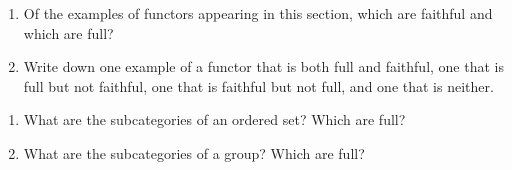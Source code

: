 \documentclass[12 pt, letterpaper]{hmcpset}
\begin{document}
\pagebreak

\begin{problem}[1.2.28]
	\begin{enumerate}
		\item Of the examples of functors appearing in this section, which are faithful and which are full?
		\item Write down one example of a functor that is both full and faithful, one that is full but not faithful, one that is faithful but not full, and one that is neither.
	\end{enumerate}
\end{problem}

\pagebreak

\begin{problem}[1.2.29]
	\begin{enumerate}
		\item What are the subcategories of an ordered set? Which are full?
		\item What are the subcategories of a group? Which are full?
	\end{enumerate}
\end{problem}
\end{document}
